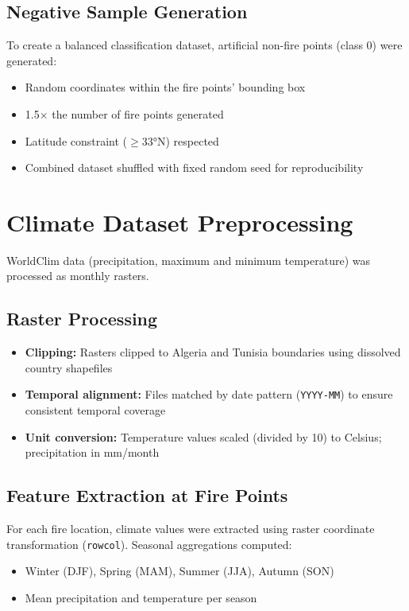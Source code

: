 \subsection{Negative Sample Generation}
To create a balanced classification dataset, artificial non-fire points (class 0) were generated:
\begin{itemize}
    \item Random coordinates within the fire points' bounding box
    \item 1.5$\times$ the number of fire points generated
    \item Latitude constraint ($\geq$33°N) respected
    \item Combined dataset shuffled with fixed random seed for reproducibility
\end{itemize}

\section{Climate Dataset Preprocessing}

WorldClim data (precipitation, maximum and minimum temperature) was processed as monthly rasters.

\subsection{Raster Processing}
\begin{itemize}
    \item \textbf{Clipping:} Rasters clipped to Algeria and Tunisia boundaries using dissolved country shapefiles
    \item \textbf{Temporal alignment:} Files matched by date pattern (\texttt{YYYY-MM}) to ensure consistent temporal coverage
    \item \textbf{Unit conversion:} Temperature values scaled (divided by 10) to Celsius; precipitation in mm/month
\end{itemize}

\subsection{Feature Extraction at Fire Points}
For each fire location, climate values were extracted using raster coordinate transformation (\texttt{rowcol}). Seasonal aggregations computed:
\begin{itemize}
    \item Winter (DJF), Spring (MAM), Summer (JJA), Autumn (SON)
    \item Mean precipitation and temperature per season
\end{itemize}

